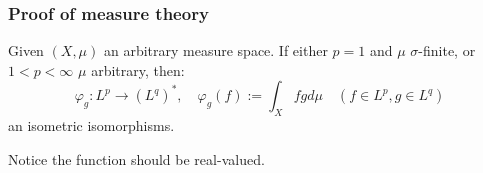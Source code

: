 \subsubsection*{Proof of measure theory}
\begin{theorem} Given $(X, \mu)$ an arbitrary measure space. 
	If either $p = 1$ and $\mu$ $\sigma$-finite, or $1 < p < \infty$ $\mu$ arbitrary, then:
	\begin{equation*}
		\varphi_g: L^p \rightarrow (L^q)^*, \quad \varphi_g(f) := \int_X fg d\mu \quad (f \in L^p, g \in L^q)
	\end{equation*}
	an isometric isomorphisms. 
\end{theorem}
\begin{remark}
Notice the function should be real-valued.	
\end{remark}

